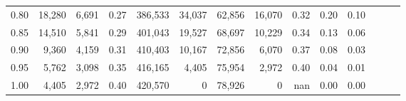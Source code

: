 \begin{tabular}{rrrrrrrrrrrrrr}
0.80 &  18,280 &  6,691 &  0.27 &  386,533 &   34,037 &  62,856 &  16,070 &  0.32 &  0.20 &      0.10 \\
0.85 &  14,510 &  5,841 &  0.29 &  401,043 &   19,527 &  68,697 &  10,229 &  0.34 &  0.13 &      0.06 \\
0.90 &   9,360 &  4,159 &  0.31 &  410,403 &   10,167 &  72,856 &   6,070 &  0.37 &  0.08 &      0.03 \\
0.95 &   5,762 &  3,098 &  0.35 &  416,165 &    4,405 &  75,954 &   2,972 &  0.40 &  0.04 &      0.01 \\
1.00 &   4,405 &  2,972 &  0.40 &  420,570 &        0 &  78,926 &       0 &   nan &  0.00 &      0.00 \\
\bottomrule
\end{tabular}
